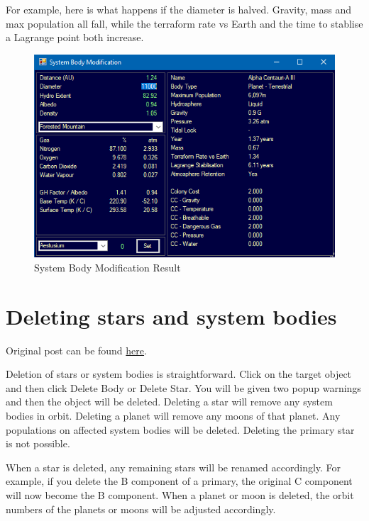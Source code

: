 \documentclass[../Aurora C# unofficial manual.tex]{subfiles}
\begin{document}
	For example, here is what happens if the diameter is halved. Gravity, mass and max population all fall, while the terraform rate vs Earth and the time to stablise a Lagrange point both increase.
	\begin{figure}[H]
		\centering
		\includegraphics[width=0.5\linewidth]{images/SystemBodyModification2}
		\caption[System Body Modification 2]{System Body Modification Result}
		\label{fig:systembodymodification2}
	\end{figure}
	
	
	\section{Deleting stars and system bodies}\label{4_deleting_stars_and_bodies}
	Original post can be found
	\href{http://aurora2.pentarch.org/index.php?topic=8495.msg118745#msg118745}{here}.
	\newline\newline
	
	Deletion of stars or system bodies is straightforward. Click on the target object and then click Delete Body or Delete Star. You will be given two popup warnings and then the object will be deleted. Deleting a star will remove any system bodies in orbit. Deleting a planet will remove any moons of that planet. Any populations on affected system bodies will be deleted. Deleting the primary star is not possible.
	
	When a star is deleted, any remaining stars will be renamed accordingly. For example, if you delete the B component of a primary, the original C component will now become the B component. When a planet or moon is deleted, the orbit numbers of the planets or moons will be adjusted accordingly.
	
\end{document}
